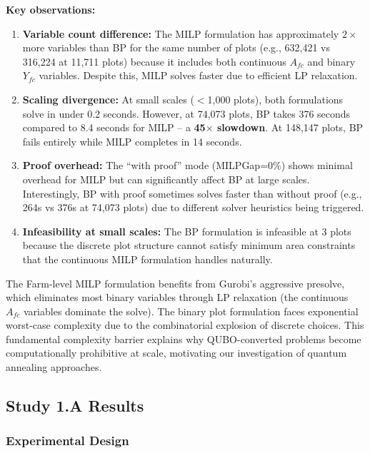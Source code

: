 \documentclass{oqireport}
\begin{document}
\textbf{Key observations:}

\begin{enumerate}
    \item \textbf{Variable count difference:} The MILP formulation has approximately $2\times$ more variables than BP for the same number of plots (e.g., 632,421 vs 316,224 at 11,711 plots) because it includes both continuous $A_{fc}$ and binary $Y_{fc}$ variables. Despite this, MILP solves faster due to efficient LP relaxation.
    
    \item \textbf{Scaling divergence:} At small scales ($<$1,000 plots), both formulations solve in under 0.2 seconds. However, at 74,073 plots, BP takes 376 seconds compared to 8.4 seconds for MILP -- a \textbf{45$\times$ slowdown}. At 148,147 plots, BP fails entirely while MILP completes in 14 seconds.
    
    \item \textbf{Proof overhead:} The ``with proof'' mode (MILPGap=0\%) shows minimal overhead for MILP but can significantly affect BP at large scales. Interestingly, BP with proof sometimes solves faster than without proof (e.g., 264s vs 376s at 74,073 plots) due to different solver heuristics being triggered.
    
    \item \textbf{Infeasibility at small scales:} The BP formulation is infeasible at 3 plots because the discrete plot structure cannot satisfy minimum area constraints that the continuous MILP formulation handles naturally.
\end{enumerate}

The Farm-level MILP formulation benefits from Gurobi's aggressive presolve, which eliminates most binary variables through LP relaxation (the continuous $A_{fc}$ variables dominate the solve). The binary plot formulation faces exponential worst-case complexity due to the combinatorial explosion of discrete choices. This fundamental complexity barrier explains why QUBO-converted problems become computationally prohibitive at scale, motivating our investigation of quantum annealing approaches.



\subsection{Study 1.A Results}
\label{subsec:hybrid_benchmarks}

\subsubsection{Experimental Design}
\end{document}
